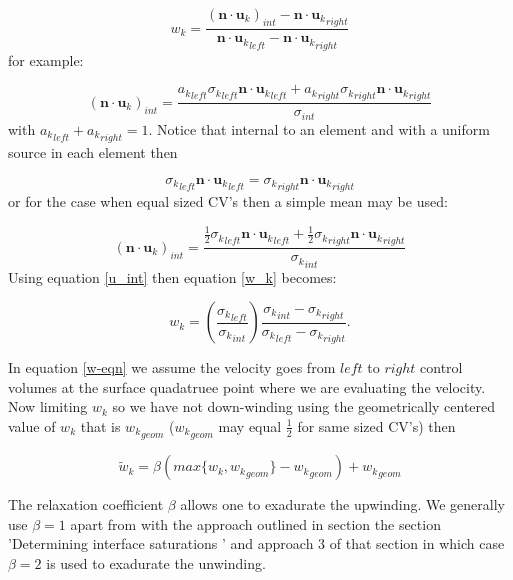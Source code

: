 \documentclass[preprint,authoryear,12pt]{elsarticle}
\begin{document}
{\begin{equation}
w_k= \frac{({{\mathbf n}\cdot{\mathbf u}_k})_{int} - {{\mathbf n}\cdot{\mathbf u}_k}_{right}}{{{\mathbf n}\cdot{\mathbf u}_k}_{left} - {{\mathbf n}\cdot{\mathbf u}_k}_{right}}
\label{w_k} 
\end{equation}
for example:

\begin{equation}
({{\mathbf n}\cdot{\mathbf u}_k})_{int}= \frac{{a_k}_{left} {\sigma_k}_{left} {{\mathbf n}\cdot{\mathbf u}_k}_{left} + {a_k}_{right} {\sigma_k}_{right} {{\mathbf n}\cdot{\mathbf u}_k}_{right}}{\sigma_{int}}
\end{equation}
with ${a_k}_{left}+{a_k}_{right}=1$. 
Notice that internal to an element and with a uniform 
source in each element then  

\begin{equation}
{\sigma_k}_{left} {{\mathbf n}\cdot{\mathbf u}_k}_{left} =  {\sigma_k}_{right} {{\mathbf n}\cdot{\mathbf u}_k}_{right}
\label{u_int} 
\end{equation}
or for the case when equal sized CV's then a simple mean may be used:

\begin{equation}
({{\mathbf n}\cdot{\mathbf u}_k})_{int}= \frac{\frac{1}{2} {\sigma_k}_{left}{{\mathbf n}\cdot{\mathbf u}_k}_{left}  
+ \frac{1}{2}{\sigma_k}_{right} {{\mathbf n}\cdot{\mathbf u}_k}_{right}}{{\sigma_k}_{int}}
\end{equation}
Using equation \ref{u_int} then equation \ref{w_k} becomes:

\begin{equation}
w_k=\left( \frac{{\sigma_k}_{left}}{{\sigma_k}_{int}} \right) 
\frac{ {\sigma_k}_{int} - {\sigma_k}_{right}} 
{ {\sigma_k}_{left} - {\sigma_k}_{right}} 
\label{w-eqn}. 
\end{equation}

In equation \ref{w-eqn} we assume the velocity goes from $left$ to $right$ 
control volumes at the surface quadatruee point 
where we are evaluating the velocity. Now limiting 
$w_k$ so we have not down-winding using the 
geometrically centered value of $w_k$ that is ${w_k}_{geom}$ 
(${w_k}_{geom}$ may equal $\frac{1}{2}$ for same sized CV's) 
then

\begin{equation}
\tilde w_k=\beta (max\{ w_k, {w_k}_{geom} \}-{w_k}_{geom}) + {w_k}_{geom}
\end{equation}

The relaxation coefficient $\beta$ allows one to 
exadurate the upwinding. We generally use $\beta=1$ apart 
from with the approach outlined in section 
the section '{Determining interface saturations  }' 
and approach 3 of that section in which case $\beta=2$ is 
used to exadurate the unwinding.  



}
\end{document}
